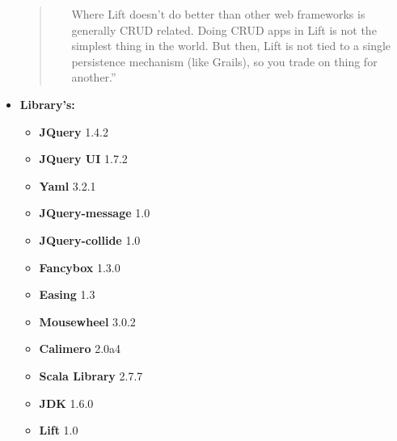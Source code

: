 \begin{itemize}
\begin{quote}
\begin{itemize}
                    Where Lift doesn't do better than other web frameworks is generally CRUD related.  Doing CRUD apps in Lift is not the simplest thing in the world. But then, Lift is not tied to a single persistence mechanism (like Grails), so you trade on thing for another.''\cite{google.com:liftgroup}
            \end{itemize}
        \end{quote}
        \item \textbf{Library's:}
        \begin{itemize}
            \item \textbf{JQuery}           1.4.2
            \item \textbf{JQuery UI}        1.7.2
            \item \textbf{Yaml}             3.2.1
            \item \textbf{JQuery-message}   1.0
            \item \textbf{JQuery-collide}   1.0
            \item \textbf{Fancybox}         1.3.0
            \item \textbf{Easing}           1.3
            \item \textbf{Mousewheel}       3.0.2
            \item \textbf{Calimero}         2.0a4
            \item \textbf{Scala Library}    2.7.7
            \item \textbf{JDK}              1.6.0
            \item \textbf{Lift}             1.0
        \end{itemize}
    \end{itemize}
